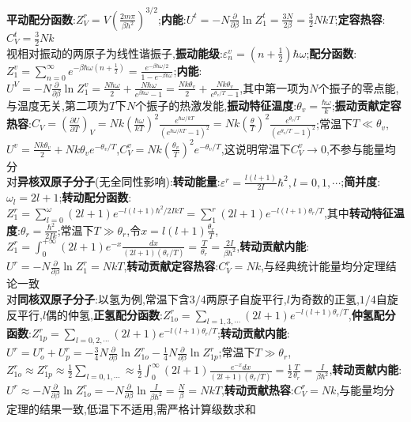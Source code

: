 \documentclass[10pt,a4paper]{article}
\begin{document}
\begin{multicols}{2}
\textbf{平动配分函数}:$Z_V^r=V\left(\frac{2m\pi}{\beta h^2}\right)^{3/2}$;\textbf{内能}:$U^t=-N\frac{\partial}{\partial\beta}\ln Z_1^t=\frac{3N}{2\beta}=\frac{3}{2}NkT$;\textbf{定容热容}:$C_V^t=\frac{3}{2}Nk$\\
视相对振动的两原子为线性谐振子,\textbf{振动能级}:$\varepsilon_n^v=\left(n+\frac{1}{2}\right)\hbar\omega$;\textbf{配分函数}:$Z_1^v=\sum_{n=0}^{\infty}e^{-\beta\hbar\omega(n+\frac{1}{2})}=\frac{e^{-\beta\hbar\omega/2}}{1-e^{-\beta\hbar\omega}}$;\textbf{内能}:$U^V=-N\frac{\partial}{\partial\beta}\ln Z_1^v=\frac{N\hbar\omega}{2}+\frac{N\hbar\omega}{e^{\beta\hbar\omega}-1}=\frac{Nk\theta_v}{2}+\frac{Nk\theta_v}{e^{\theta_v/T}-1}$,其中第一项为$N$个振子的零点能,与温度无关,第二项为$T$下$N$个振子的热激发能,\textbf{振动特征温度}:$\theta_v=\frac{\hbar\omega}{k}$;\textbf{振动贡献定容热容}:$C_V=\left(\frac{\partial U}{\partial T}\right)_V=Nk\left(\frac{\hbar\omega}{kT}\right)^2\frac{e^{\hbar\omega/kT}}{(e^{\hbar\omega/kT}-1)^2}=Nk\left(\frac{\theta}{T}\right)^2\frac{e^{\theta_v/T}}{(e^{\theta_v/T}-1)^2}$;常温下$T\ll\theta_v$,$U^v=\frac{Nk\theta_v}{2}+Nk\theta_ve^{-\theta_v/T}$,$C_V^v=Nk\left(\frac{\theta_v}{T}\right)^2e^{-\theta_v/T}$,这说明常温下$C_V^v\rightarrow0$,不参与能量均分\\
对\textbf{异核双原子分子}(无全同性影响):\textbf{转动能量}:$\varepsilon^r=\frac{l(l+1)}{2I}\hbar^2,l=0,1,\cdots$;\textbf{简并度}:$\omega_l=2l+1$;\textbf{转动配分函数}:$Z_1^r=\sum_{l=0}^{\omega}(2l+1)e^{-l(l+1)\hbar^2/2IkT}=\sum_1^r(2l+1)e^{-l(l+1)\theta_r/T}$,其中\textbf{转动特征温度}:$\theta_r=\frac{\hbar^2}{2Ik}$;常温下$T\gg\theta_r$,令$x=l(l+1)\frac{\theta_r}{T}$,$Z_1^r=\int_0^{+\infty}(2l+1)e^{-x}\frac{dx}{(2l+1)(\theta_r/T)}=\frac{T}{\theta_r}=\frac{2I}{\beta\hbar^2}$,\textbf{转动贡献内能}:$U^r=-N\frac{\partial}{\partial\beta}\ln Z_1^r=NkT$,\textbf{转动贡献定容热容}:$C_V^r=Nk$,与经典统计能量均分定理结论一致\\
对\textbf{同核双原子分子}:以氢为例,常温下含$3/4$两原子自旋平行,$l$为奇数的正氢,$1/4$自旋反平行,$l$偶的仲氢,\textbf{正氢配分函数}:$Z_{1o}^r=\sum_{l=1,3,\cdots}(2l+1)e^{-l(l+1)\theta_r/T}$,\textbf{仲氢配分函数}:$Z_{1p}^r=\sum_{l=0,2,\cdots}(2l+1)e^{-l(l+1)\theta_r/T}$;\textbf{转动贡献内能}:$U^r=U_o^r+U_p^r=-\frac{3}{4}N\frac{\partial}{\partial\beta}\ln Z_{1o}^r-\frac{1}{4}N\frac{\partial}{\partial\beta}\ln Z_{1p}^r$;常温下$T\gg\theta_r$,$Z_{1o}^r\approx Z_{1p}^r\approx\frac{1}{2}\sum_{l=0,1,\cdots}\approx\frac{1}{2}\int_0^{\infty}(2l+1)\frac{e^{-x}dx}{(2l+1)(\theta_r/T)}=\frac{1}{2}\frac{T}{\theta_r}=\frac{I}{\beta\hbar^2}$,\textbf{转动贡献内能}:$U^r\approx-N\frac{\partial}{\partial\beta}\ln Z_{1o}^r=-N\frac{\partial}{\partial\beta}\ln\frac{I}{\beta\hbar^2}=\frac{N}{\beta}=NkT$,\textbf{转动贡献热容}:$C_V^r=Nk$,与能量均分定理的结果一致,低温下不适用,需严格计算级数求和\\

\end{multicols}
\end{document}
